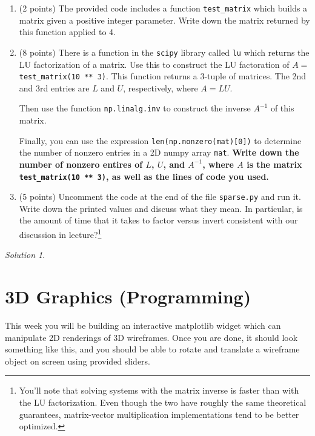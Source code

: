 \documentclass{article}
\theoremstyle{remark}
\newtheorem*{solution}{Solution}
\begin{document}
\begin{enumerate}
\item (2 points) The provided code includes a function \texttt{test\_matrix} which builds a matrix given a positive integer parameter. Write down the matrix returned by this function applied to 4.

\item (8 points) There is a function in the \texttt{scipy} library called \texttt{lu} which returns the LU factorization of a matrix.
  Use this to construct the LU factoration of $A = $ \texttt{test\_matrix(10 ** 3)}.
  This function returns a 3-tuple of matrices.
  The 2nd and 3rd entries are $L$ and $U$, respectively, where $A = LU$.

  Then use the function \texttt{np.linalg.inv} to construct the inverse $A^{-1}$ of this matrix.

  Finally, you can use the expression \texttt{len(np.nonzero(mat)[0])} to determine the number of nonzero entries in a 2D numpy array \texttt{mat}.
  \textbf{Write down the number of nonzero entires of $L$, $U$, and $A^{-1}$, where $A$ is the matrix \texttt{test\_matrix(10 ** 3)}, as well as the lines of code you used.}
\item (5 points)
  Uncomment the code at the end of the file \texttt{sparse.py} and run it.
  Write down the printed values and discuss what they mean.
  In particular, is the amount of time that it takes to factor versus invert consistent with our discussion in lecture?\footnote{You'll note that solving systems with the matrix inverse is faster than with the LU factorization. Even though the two have roughly the same theoretical guarantees, matrix-vector multiplication implementations tend to be better optimized.}
\end{enumerate}

\medskip

\begin{solution}
\end{solution}

\vfill

\pagebreak
\section{3D Graphics (Programming)}

\medskip

This week you will be building an interactive matplotlib widget which can manipulate 2D renderings of 3D wireframes.
Once you are done, it should look something like this, and you should be able to rotate and translate a wireframe object on screen using provided sliders.
\end{document}
